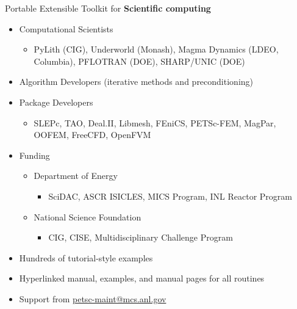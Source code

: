 \begin{frame}{Portable Extensible Toolkit for {\bf Scientific computing}}
  \begin{itemize}
  \item Computational Scientists
    \begin{itemize}
    \item PyLith (CIG), Underworld (Monash), Magma Dynamics (LDEO, Columbia), PFLOTRAN (DOE), SHARP/UNIC (DOE)
    \end{itemize}
  \item Algorithm Developers (iterative methods and preconditioning)
  \item Package Developers
    \begin{itemize}
    \item SLEPc, TAO, Deal.II, Libmesh, FEniCS, PETSc-FEM, MagPar, OOFEM, FreeCFD, OpenFVM
    \end{itemize}
  \item Funding
    \begin{itemize}\item Department of Energy
      \begin{itemize}\item SciDAC, ASCR ISICLES, MICS Program, INL Reactor Program
      \end{itemize}
    \item National Science Foundation
      \begin{itemize}\item CIG, CISE, Multidisciplinary Challenge Program
      \end{itemize}
    \end{itemize}
  \item Hundreds of tutorial-style examples
  \item Hyperlinked manual, examples, and manual pages for all routines
  \item Support from \url{petsc-maint@mcs.anl.gov}
\end{itemize}
\end{frame}
